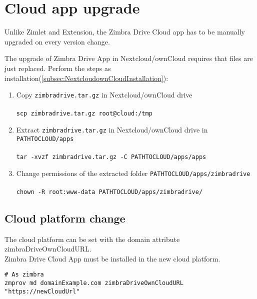 \section{Cloud app upgrade}
Unlike Zimlet and Extension, the Zimbra Drive Cloud app has to be manually upgraded on every version change.

The upgrade of Zimbra Drive App in Nextcloud/ownCloud requires that files are just replaced.
Perform the steps as installation(\ref{subsec:NextcloudownCloudInstallation}):
    \begin{enumerate}
        \item Copy \texttt{zimbradrive.tar.gz} in Nextcloud/ownCloud drive\\ \\
        \texttt{scp zimbradrive.tar.gz root@cloud:/tmp}\\
        \item Extract \texttt{zimbradrive.tar.gz} in Nextcloud/ownCloud drive in \texttt{PATH\textunderscore TO\textunderscore CLOUD/apps}\\ \\
        \texttt{tar -xvzf zimbradrive.tar.gz -C \texttt{PATH\textunderscore TO\textunderscore CLOUD/apps}/apps}\\
        \item Change permissions of the extracted folder \texttt{PATH\textunderscore TO\textunderscore CLOUD/apps/zimbradrive}\\ \\
        \texttt{chown -R root:www-data \texttt{PATH\textunderscore TO\textunderscore CLOUD}/apps/zimbradrive/}\\
    \end{enumerate}

\subsection{Cloud platform change}
The cloud platform can be set with the domain attribute zimbraDriveOwnCloudURL.\\
Zimbra Drive Cloud App must be installed in the new cloud platform.
\begin{verbatim}
# As zimbra
zmprov md domainExample.com zimbraDriveOwnCloudURL "https://newCloudUrl"
\end{verbatim}
